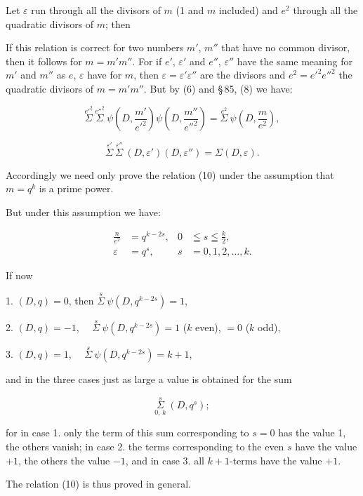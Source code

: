 Let $\varepsilon$ run through all the divisors of $m$ (1 and $m$
included) and $e^2$ through all the quadratic divisors of
$m$; then


If this relation is correct for two numbers $m'$, $m''$ that have no
common divisor, then it follows for $m=m'm''$. For if
$e'$, $\varepsilon'$ and $e''$, $\varepsilon''$ have the same meaning for $m'$ and $m''$ as
$e$, $\varepsilon$ have for $m$, then $\varepsilon=\varepsilon'\varepsilon''$ are the divisors and $e^2=e'^2e''^2$ the
quadratic divisors of $m=m'm''$. But by (6) and
\S\,85, (8) we have:

\[ \overset{e'^2}{\Sigma}\ \overset{e''^2}{\Sigma}\ \psi\!\left(D,\frac{m'}{e'^2}\right)\psi\!\left(D,\frac{m''}{e''^2}\right) = \overset{e^2}{\Sigma}\ \psi\!\left(D,\frac{m}{e^2}\right), \]

\[ \overset{\varepsilon'}{\Sigma}\ \overset{\varepsilon''}{\Sigma}\ (D,\varepsilon')(D,\varepsilon'') = \Sigma(D,\varepsilon). \]

Accordingly we need only prove the relation (10) under the
assumption that $m=q^k$ is a prime power.

But under this assumption we have:

\[
\begin{aligned}
\frac{n}{e^2}&=q^{k-2s}, & 0&\leqq s \leqq \frac{k}{2},\\
\varepsilon&=q^s, & s&=0,1,2,\dots,k.
\end{aligned}
\] %

If now

1. $(D,q)=0$, then $\overset{s}{\Sigma}\ \psi(D,q^{k-2s}) = 1$,

2. $(D,q)=-1$, \text{\glqq}\ \text{\glqq}\ $\overset{s}{\Sigma}\ \psi(D,q^{k-2s}) = 1$ ($k$ even),
\hspace{4em}$= 0$ ($k$ odd),

3. $(D,q)=1$, \text{\glqq}\ \text{\glqq}\ $\overset{s}{\Sigma}\ \psi(D,q^{k-2s}) = k+1$,

and in the three cases just as large a value is obtained for the sum

\[ \underset{0,\,k}{\overset{s}{\Sigma}}\ (D,q^s); \]

for in case 1. only the term of this sum corresponding to $s=0$
has the value 1, the others vanish; in case 2.
the terms corresponding to the even $s$ have the value $+1$,
the others the value $-1$, and in case 3. all
$k+1$-terms have the value $+1$.

The relation (10) is thus proved in general.
